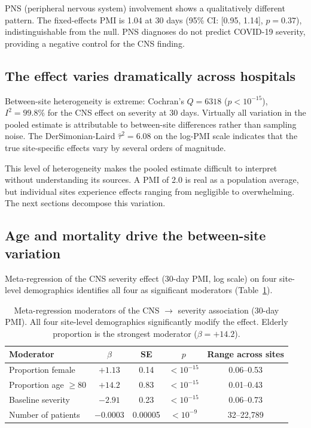 \documentclass{article}
\begin{document}
PNS (peripheral nervous system) involvement shows a qualitatively different pattern. The fixed-effects PMI is 1.04 at 30 days (95\% CI: [0.95, 1.14], $p = 0.37$), indistinguishable from the null. PNS diagnoses do not predict COVID-19 severity, providing a negative control for the CNS finding.


\subsection{The effect varies dramatically across hospitals}

Between-site heterogeneity is extreme: Cochran's $Q = 6318$ ($p < 10^{-15}$), $I^2 = 99.8\%$ for the CNS effect on severity at 30 days. Virtually all variation in the pooled estimate is attributable to between-site differences rather than sampling noise. The DerSimonian-Laird $\hat\tau^2 = 6.08$ on the log-PMI scale indicates that the true site-specific effects vary by several orders of magnitude.

This level of heterogeneity makes the pooled estimate difficult to interpret without understanding its sources. A PMI of 2.0 is real as a population average, but individual sites experience effects ranging from negligible to overwhelming. The next sections decompose this variation.


\subsection{Age and mortality drive the between-site variation}

Meta-regression of the CNS severity effect (30-day PMI, log scale) on four site-level demographics identifies all four as significant moderators (Table~\ref{tab:moderators}).

\begin{table}[t]
\centering
\caption{Meta-regression moderators of the CNS $\to$ severity association (30-day PMI). All four site-level demographics significantly modify the effect. Elderly proportion is the strongest moderator ($\beta = +14.2$).}
\label{tab:moderators}
\begin{tabular}{lcccc}
\toprule
Moderator & $\beta$ & SE & $p$ & Range across sites \\
\midrule
Proportion female & $+1.13$ & 0.14 & $< 10^{-15}$ & 0.06--0.53 \\
Proportion age $\geq 80$ & $+14.2$ & 0.83 & $< 10^{-15}$ & 0.01--0.43 \\
Baseline severity & $-2.91$ & 0.23 & $< 10^{-15}$ & 0.06--0.73 \\
Number of patients & $-0.0003$ & 0.00005 & $< 10^{-9}$ & 32--22{,}789 \\
\bottomrule
\end{tabular}
\end{table}
\end{document}
